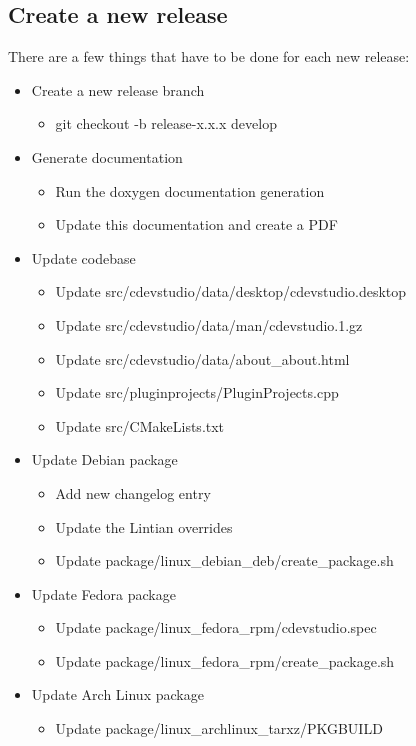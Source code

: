\documentclass{article}
\begin{document}
\subsection{Create a new release}
There are a few things that have to be done for each new release:

\begin{itemize}
	\item Create a new release branch
	\begin{itemize}
		\item git checkout -b release-x.x.x develop
	\end{itemize}
	\item Generate documentation
	\begin{itemize}
		\item Run the doxygen documentation generation
		\item Update this documentation and create a PDF
	\end{itemize}
	\item Update codebase
	\begin{itemize}
		\item Update src/cdevstudio/data/desktop/cdevstudio.desktop
		\item Update src/cdevstudio/data/man/cdevstudio.1.gz
		\item Update src/cdevstudio/data/about_about.html
		\item Update src/pluginprojects/PluginProjects.cpp
		\item Update src/CMakeLists.txt
	\end{itemize}
	\item Update Debian package
	\begin{itemize}
		\item Add new changelog entry
		\item Update the Lintian overrides
		\item Update package/linux_debian_deb/create_package.sh
	\end{itemize}
	\item Update Fedora package
	\begin{itemize}
		\item Update package/linux_fedora_rpm/cdevstudio.spec
		\item Update package/linux_fedora_rpm/create_package.sh
	\end{itemize}
	\item Update Arch Linux package
	\begin{itemize}
		\item Update package/linux_archlinux_tarxz/PKGBUILD

\end{itemize}
\end{itemize}
\end{document}
